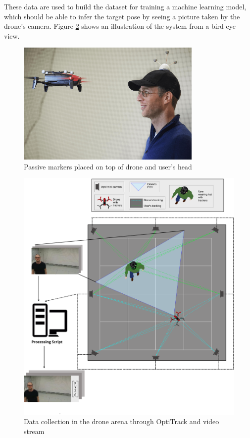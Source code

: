 These data are used to build the dataset for training a machine learning model, which should be able to infer the target pose by seeing a picture taken by the drone's camera. Figure \ref{fig:drone-demo-2} shows an illustration of the system from a bird-eye view.

\medskip

\begin{figure}[!htb]
	\centering
	\includegraphics[width=0.8\textwidth]{"contents/images/03-drone-facing"}
	\caption[Passive markers placed on top of drone and user's head]{Passive markers placed on top of drone and user's head}
	\label{fig:drone-facing}
\end{figure}

\begin{figure}[!htb]
	\centering
	\includegraphics[width=1\textwidth]{"contents/images/03-arena-demo-2"}
	\caption[Data collection in the drone arena through OptiTrack and video stream]{Data collection in the drone arena through OptiTrack and video stream}
	\label{fig:drone-demo-2}
\end{figure}




